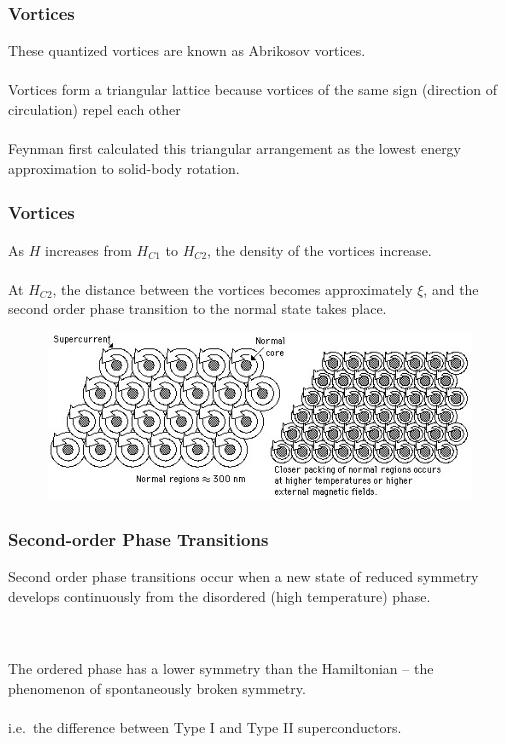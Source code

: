 \documentclass[10pt]{beamer}
\theoremstyle{definition}
\begin{document}
\begin{frame}[<+->]
    \frametitle{Vortices}

    These quantized vortices are known as Abrikosov vortices.
    \\~\\

    Vortices form a triangular lattice because vortices of the same sign 
    (direction of circulation) repel each other
    \\~\\

    Feynman first calculated this triangular arrangement as the lowest energy
    approximation to solid-body rotation.


\end{frame}

\begin{frame}
    \frametitle{Vortices}

    As $H$ increases from $H_{C1}$ to $H_{C2}$, the density of the vortices
    increase.
    \\~\\
    At $H_{C2}$, the distance between the vortices becomes approximately
    $\xi$, and the second order phase transition to the normal state takes
    place.


    \begin{figure}
    \begin{center}
        \includegraphics[scale=0.006]{svort}
    \end{center}
    \end{figure}

\end{frame}



\begin{frame}
    \frametitle{Second-order Phase Transitions}
    Second order phase transitions occur when a new state of
reduced symmetry
develops continuously from the
disordered (high temperature) phase. 

\\~\\
The ordered phase has a
lower symmetry
than the Hamiltonian -- the
phenomenon of
spontaneously broken symmetry.
\\~\\
i.e.\ the difference between Type I and Type II superconductors.

\end{frame}
\end{document}
